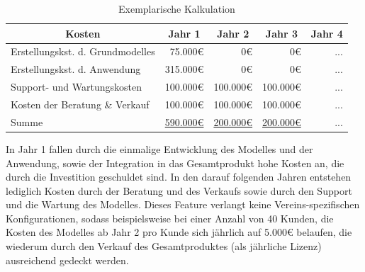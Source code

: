 \begin{table}[H]
\centering
\caption{Exemplarische Kalkulation}
\label{calc}
\begin{tabular}{|l|r|r|r|r|}
\hline
\multicolumn{1}{|c|}{\textbf{Kosten}} & \multicolumn{1}{c|}{\textbf{Jahr 1}} & \multicolumn{1}{c|}{\textbf{Jahr 2}} & \multicolumn{1}{c|}{\textbf{Jahr 3}} & \multicolumn{1}{c|}{\textbf{Jahr 4}} \\ \hline
Erstellungskst. d. Grundmodelles      & 75.000\euro                              & 0\euro                                   & 0\euro                                   & ...                                  \\ \hline
Erstellungskst. d. Anwendung          & 315.000\euro                             & 0\euro                                   & 0\euro                                   & ...                                   \\ \hline
Support- und Wartungskosten           & 100.000\euro                             & 100.000\euro                             & 100.000\euro                             & ...                                  \\ \hline
Kosten der Beratung \& Verkauf        & 100.000\euro                             & 100.000\euro                             & 100.000\euro                             & ...                                  \\ \hline
Summe                                 & \underline{590.000\euro}                             & \underline{200.000\euro} & \underline{200.000\euro}                            & ...                                  \\ \hline
\end{tabular}
\end{table}

In Jahr 1 fallen durch die einmalige Entwicklung des Modelles und der Anwendung, sowie der Integration in das Gesamtprodukt hohe Kosten an, die durch die Investition geschuldet sind. In den darauf folgenden Jahren entstehen lediglich Kosten durch der Beratung und des Verkaufs sowie durch den Support und die Wartung des Modelles. Dieses Feature verlangt keine Vereins-spezifischen Konfigurationen, sodass beispielsweise bei einer Anzahl von 40 Kunden, die Kosten des Modelles ab Jahr 2 pro Kunde sich jährlich auf \textsf{5.000\euro} belaufen, die wiederum durch den Verkauf des Gesamtproduktes (als jährliche Lizenz) ausreichend gedeckt werden. 


